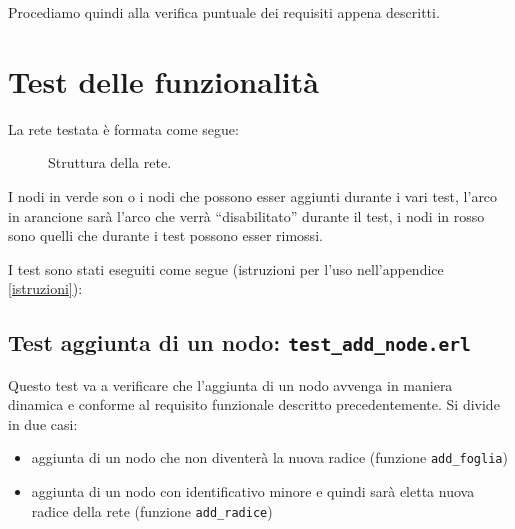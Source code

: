 \documentclass[italian]{memoir}
\begin{document}
Procediamo quindi alla verifica puntuale dei requisiti appena descritti.

\section{Test delle funzionalità}

La rete testata è formata come segue:
\begin{figure}[H]
\caption{Struttura della rete.} 
\end{figure}
I nodi in verde son o i nodi che possono esser aggiunti durante i vari test, l'arco in arancione sarà l'arco che verrà ``disabilitato'' durante il test, i nodi in rosso sono quelli che durante i test possono esser rimossi. 

I test sono stati eseguiti come segue (istruzioni per l'uso nell'appendice \ref{istruzioni}):

\subsection{Test aggiunta di un nodo: \texttt{test\_add\_node.erl}}

Questo test va a verificare che l'aggiunta di un nodo avvenga in maniera dinamica e conforme al requisito funzionale descritto precedentemente.
Si divide in due casi:
\begin{itemize}
\item aggiunta di un nodo che non diventerà la nuova radice (funzione \texttt{add\_foglia})
\item aggiunta di un nodo con identificativo minore e quindi sarà eletta nuova radice della rete (funzione \texttt{add\_radice})
\end{itemize}
\end{document}
